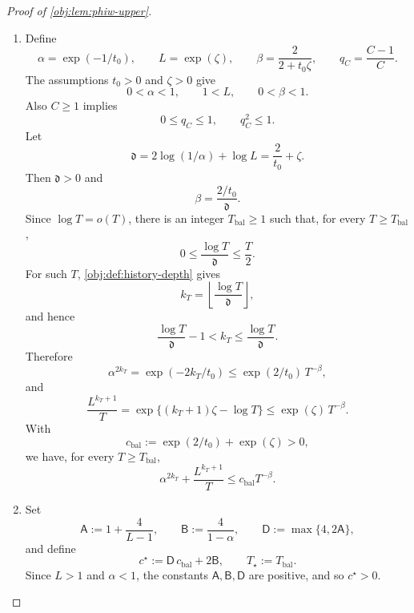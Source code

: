 \documentclass[11pt]{article}
\begin{document}
\begin{proof}[Proof of \cref{obj:lem:phiw-upper}]
\begin{enumerate}
\item Define
\[
\alpha=\exp(-1/t_0),\qquad L=\exp(\zeta),\qquad
\beta=\frac{2}{2+t_0\zeta},
\qquad q_C=\frac{C-1}{C}.
\]
The assumptions \(t_0>0\) and \(\zeta>0\) give
\[
0<\alpha<1,\qquad 1<L,\qquad 0<\beta<1.
\]
Also \(C\ge1\) implies
\[
0\le q_C\le1,\qquad q_C^2\le1.
\]
Let
\[
\mathfrak d
=
2\log(1/\alpha)+\log L
=
\frac{2}{t_0}+\zeta .
\]
Then \(\mathfrak d>0\) and
\[
\beta=\frac{2/t_0}{\mathfrak d}.
\]
Since \(\log T=o(T)\), there is an integer \(T_{\mathrm{bal}}\ge1\) such that, for every
\(T\ge T_{\mathrm{bal}}\),
\[
0\le \frac{\log T}{\mathfrak d}\le \frac{T}{2}.
\]
For such \(T\), \cref{obj:def:history-depth} gives
\[
k_T=\left\lfloor\frac{\log T}{\mathfrak d}\right\rfloor ,
\]
and hence
\[
\frac{\log T}{\mathfrak d}-1<k_T\le \frac{\log T}{\mathfrak d}.
\]
Therefore
\[
\alpha^{2k_T}
=
\exp(-2k_T/t_0)
\le
\exp(2/t_0)\,T^{-\beta},
\]
and
\[
\frac{L^{k_T+1}}{T}
=
\exp\{(k_T+1)\zeta-\log T\}
\le
\exp(\zeta)\,T^{-\beta}.
\]
With
\[
c_{\mathrm{bal}}:=\exp(2/t_0)+\exp(\zeta)>0,
\]
we have, for every \(T\ge T_{\mathrm{bal}}\),
\[
\alpha^{2k_T}+\frac{L^{k_T+1}}{T}
\le
c_{\mathrm{bal}}T^{-\beta}.
\]

\item Set
\[
\mathsf A:=1+\frac{4}{L-1},
\qquad
\mathsf B:=\frac{4}{1-\alpha},
\qquad
\mathsf D:=\max\{4,2\mathsf A\},
\]
and define
\[
c^\star:=\mathsf D\,c_{\mathrm{bal}}+2\mathsf B,
\qquad
T_\star:=T_{\mathrm{bal}}.
\]
Since \(L>1\) and \(\alpha<1\), the constants \(\mathsf A,\mathsf B,\mathsf D\) are positive, and so
\(c^\star>0\).


\end{enumerate}
\end{proof}
\end{document}
